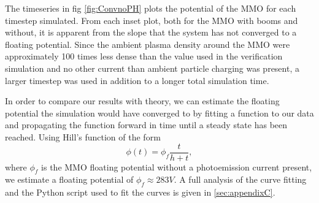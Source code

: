 The timeseries in fig \ref{fig:ConvnoPH} plots the potential of the MMO for each timestep simulated. From each inset plot, both for the MMO with booms and without, it is apparent from the slope that the system has not converged to a floating potential. Since the ambient plasma density around the MMO were approximately 100 times less dense than the value used in the verification simulation and no other current than ambient particle charging was present, a larger timestep was used in addition to a longer total simulation time. 

In order to compare our results with theory, we can estimate the floating potential the simulation would have converged to by fitting a function to our data and propagating the function forward in time until a steady state has been reached. Using Hill's function of the form 
\begin{equation*}
    \phi(t) = \phi_f \frac{t}{h + t},
\end{equation*}
where $\phi_f$ is the MMO floating potential without a photoemission current present, we estimate a floating potential of $\phi_f \approx 283 V$. A full analysis of the curve fitting and the Python script used to fit the curves is given in  \cref{sec:appendixC}.


